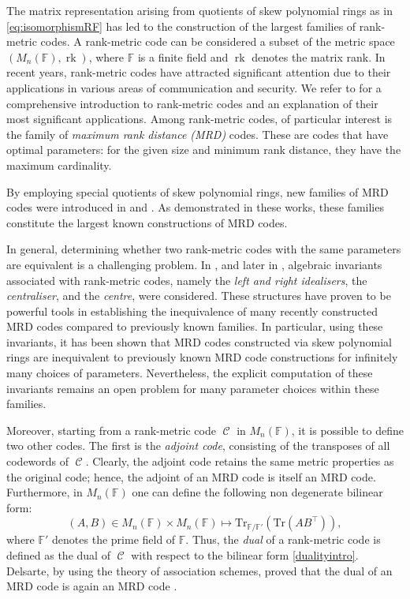 \documentclass[a4paper, 11pt]{article}
\DeclareMathOperator{\C}{\mathcal{C}}
\DeclareMathOperator{\rk}{rk}
\newcommand{\F}{{\mathbb F}}
\newcommand{\Tr}{{\mathrm{Tr}}}
\begin{document}
The matrix representation arising from quotients of skew polynomial rings as in \eqref{eq:isomorphismRF} has led to the construction of the largest families of rank-metric codes. A rank-metric code can be considered a subset of the metric space $(M_n(\F),\rk)$, where $\F$ is a finite field and $\rk$ denotes the matrix rank. In recent years, rank-metric codes have attracted significant attention due to their applications in various areas of communication and security. We refer to \cite{gorla2018codes,bartz2022rank} for a comprehensive introduction to rank-metric codes and an explanation of their most significant applications. Among rank-metric codes, of particular interest is the family of \emph{maximum rank distance (MRD)} codes. These are codes that have optimal parameters: for the given size  and minimum rank distance, they have the maximum cardinality.

By employing special quotients of skew polynomial rings, new families of MRD codes were introduced in \cite{sheekey2020new} and \cite{lobillo2025quotients}. As demonstrated in these works, these families constitute the largest known constructions of MRD codes.



In general, determining whether two rank-metric codes with the same parameters are equivalent is a challenging problem. In \cite{liebhold2016automorphism,lunardon2018nuclei}, and later in \cite{sheekey2020new}, algebraic invariants associated with rank-metric codes, namely the \emph{left and right idealisers}, the \emph{centraliser}, and the \emph{centre}, were considered. These structures have proven to be powerful tools in establishing the inequivalence of many recently constructed MRD codes compared to previously known families. In particular, using these invariants, it has been shown that MRD codes constructed via skew polynomial rings are inequivalent to previously known MRD code constructions for infinitely many choices of parameters. Nevertheless, the explicit computation of these invariants remains an open problem for many parameter choices within these families.

Moreover, starting from a rank-metric code $\C$ in $M_n(\F)$, it is possible to define two other codes. The first is the \emph{adjoint code}, consisting of the transposes of all codewords of $\C$. Clearly, the adjoint code retains the same metric properties as the original code; hence, the adjoint of an MRD code is itself an MRD code. Furthermore, in $M_n(\F)$ one can define the following non degenerate  bilinear form: 
\begin{equation} \label{dualityintro}
    (A,B) \in M_n(\F) \times M_n(\F) \longmapsto \Tr_{\F/\F'}(\Tr(AB^{\top})), 
\end{equation}
where $\F'$ denotes the prime field of $\F$. Thus, the \emph{dual} of a rank-metric code is defined as the dual of $\C$ with respect to the bilinear form \eqref{dualityintro}. Delsarte, by using the theory of association schemes, proved that the dual of an MRD code is again an MRD code \cite{delsarte1978bilinear}. 
\end{document}
